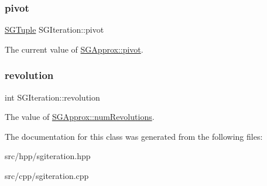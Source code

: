 \subsubsection{\texorpdfstring{pivot}{pivot}}
{\footnotesize\ttfamily \hyperlink{classSGTuple}{S\+G\+Tuple} S\+G\+Iteration\+::pivot\hspace{0.3cm}{\ttfamily [private]}}

The current value of \hyperlink{classSGApprox_a037c73ff2b6ff8a55fadf57bb0a6a546}{S\+G\+Approx\+::pivot}. \mbox{\label{classSGIteration_a21cc5c4fc7c40ff444ac7e3743c13940}} 
\subsubsection{\texorpdfstring{revolution}{revolution}}
{\footnotesize\ttfamily int S\+G\+Iteration\+::revolution\hspace{0.3cm}{\ttfamily [private]}}

The value of \hyperlink{classSGApprox_a2bd0cab80a3f8d799fdc2841b65dd2c2}{S\+G\+Approx\+::num\+Revolutions}. 

The documentation for this class was generated from the following files\+:\begin{DoxyCompactItemize}
\item 
src/hpp/sgiteration.\+hpp\item 
src/cpp/sgiteration.\+cpp\end{DoxyCompactItemize}
